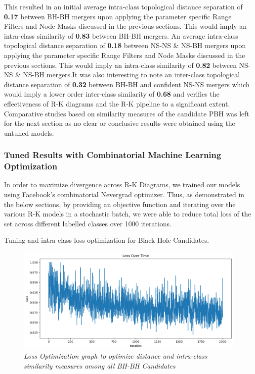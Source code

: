 This resulted in an initial average intra-class topological distance separation of \textbf{0.17} between BH-BH mergers upon applying the parameter specific Range Filters and Node Masks discussed in the previous sections. This would imply an intra-class similarity of \textbf{0.83} between BH-BH mergers. An average intra-class topological distance separation of \textbf{0.18} between NS-NS \& NS-BH mergers upon applying the parameter specific Range Filters and Node Masks discussed in the previous sections. This would imply an intra-class similarity of \textbf{0.82} between NS-NS \& NS-BH mergers.It was also interesting to note an inter-class topological distance separation of \textbf{0.32} between BH-BH and confident NS-NS mergers which would imply a lower order inter-class similarity of \textbf{0.68} and verifies the effectiveness of R-K diagrams and the R-K pipeline to a significant extent. Comparative studies based on similarity measures of the candidate PBH was left for the next section as no clear or conclusive results were obtained using the untuned  models. 


\subsubsection{Tuned Results with Combinatorial Machine Learning Optimization}

In order to maximize divergence across R-K Diagrams, we trained our models using Facebook's combinatorial Nevergrad \cite{a2020_nevergrad} optimizer. Thus, as demonstrated in the below sections, by providing an objective function and iterating over the various R-K models in a stochastic batch, we were able to reduce total loss of the set across different labelled classes over 1000 iterations.

Tuning and intra-class loss optimization for Black Hole Candidates. 

\begin{figure}[H]
        \centering
 	\includegraphics[width=1.0\linewidth]{images/IntraClass_Tuning&Loss_ForBHs.png}
 	\caption{\textit{Loss Optimization graph to optimize distance and intra-class similarity measures among all BH-BH Candidates}}
 	\label{fig:intra-class_BH_Loss}
\end{figure}

